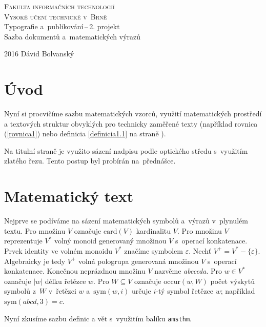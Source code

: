 \documentclass[a4paper,11pt,twocolumn,titlepage]{article}[11.3.2016]
\begin{document}
\begin{titlepage}
	\begin{center}
		{\Huge\textsc{Fakulta informačních technologií\\
		Vysoké učení technické v~Brně}}\\
	    {\LARGE{Typografie a~publikování\,--\,2. projekt\\
		Sazba dokumentů a~matematických výrazů}}
	\end{center}
	{\Large 2016 \hfill Dávid Bolvanský }
\end{titlepage}

\section*{Úvod} 
Nyní si procvičíme sazbu matematických vzorců, využití matematických prostředí a textových struktur obvyklých pro technicky zaměřené texty (na\-příklad rovnica (\ref{rovnica1}) nebo definicia \ref{definicia1.1} na straně \pageref{definicia1.1}). 

Na titulní straně je využito sázení nadpisu podle op\-tic\-ké\-ho středu s~využitím zlatého řezu. Tento postup byl probírán na~přednášce.

\section{Matematický text}
Nejprve se podíváme na sázení matematických symbolů a~výrazů v~plynulém textu.
Pro množinu $V$ označuje $\mbox{card}(V)$ kardinalitu $V$. 
Pro množinu $V$ reprezentuje $V^*$ volný monoid generovaný množinou $V$ s~operací konkatenace. 
Prvek identity ve volném monoidu $V^*$ značíme symbolem $\varepsilon$.  
Nechť $V^+ = V^* - \{\varepsilon\}$. Algebraicky je tedy $V^+$ volná pologrupa generovaná množinou $V$ s~operací konkatenace. 
Konečnou neprázdnou množinu $V$ nazvěme \emph{abeceda}.
Pro $w \in V^*$ označuje $|w|$ délku řetězce $w$. Pro $W \subseteq V$ označuje $\mbox{occur}(w,W)$ počet výskytů symbolů z~$W$ v~řetězci $w$ a~$\mbox{sym}(w,i)$ určuje $i$-tý symbol řetězce $w$; například $\mbox{sym}(abcd,3)=c$.

Nyní zkusíme sazbu definic a vět s~vy\-užitím balíku \texttt{amsthm}.

\newtheorem{definicia}{Definice}[section]
\end{document}
